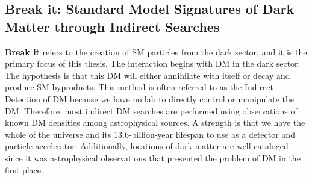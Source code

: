 \subsection{Break it: Standard Model Signatures of Dark Matter through Indirect Searches\label{sec:break_it}}

\textbf{Break it} refers to the creation of SM particles from the dark sector, and it is the primary focus of this thesis.
The interaction begins with DM in the dark sector.
The hypothesis is that this DM will either annihilate with itself or decay and produce SM byproducts.
This method is often referred to as the Indirect Detection of DM because we have no lab to directly control or manipulate the DM.
Therefore, most indirect DM searches are performed using observations of known DM densities among astrophysical sources.
A strength is that we have the whole of the universe and its 13.6-billion-year lifespan to use as a detector and particle accelerator.
Additionally, locations of dark matter are well cataloged since it was astrophysical observations that presented the problem of DM in the first place.

\begin{figure}[ht]
\end{figure}

